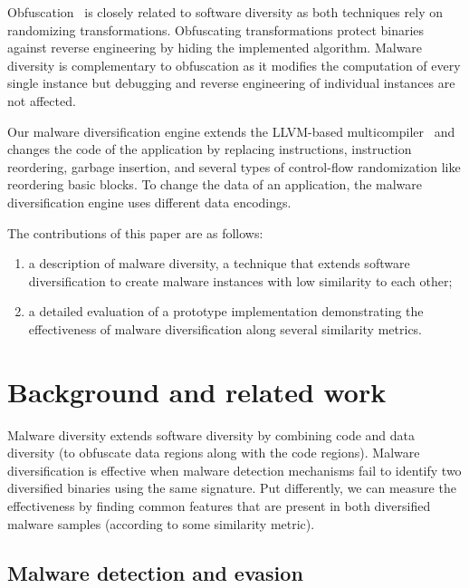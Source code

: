 \documentclass[letterpaper,twocolumn,10pt]{article}
\begin{document}
Obfuscation~\cite{collberg97} is closely related to software diversity as both 
techniques rely on randomizing transformations. Obfuscating transformations
protect binaries against reverse engineering by hiding the implemented algorithm.  
Malware diversity is complementary to obfuscation as it modifies the computation 
of every single instance but debugging and reverse engineering of individual 
instances are not affected.

Our malware diversification engine extends the LLVM-based
multicompiler~\cite{multicompiler, payer14syscan} and changes the code of the
application by replacing instructions, instruction reordering, garbage
insertion, and several types of control-flow randomization like reordering basic
blocks. To change the data of an application, the malware diversification engine
uses different data encodings.


The contributions of this paper are as follows:
\begin{enumerate}
  \item a description of malware diversity, a technique that extends
    software diversification to create malware instances with low similarity to
		each other;
  \item a detailed evaluation of a prototype implementation demonstrating
		the effectiveness of malware diversification along several similarity
    metrics.
\end{enumerate}


\section{Background and related work}

Malware diversity extends software diversity by combining code and
data diversity (to obfuscate data regions along with the code regions).  Malware
diversification is effective when malware detection mechanisms fail to identify
two diversified binaries using the same signature.  Put differently, we can
measure the effectiveness by finding common features that are present in both
diversified malware samples (according to some similarity metric).

\subsection{Malware detection and evasion}
\label{sec:malwarematching}
\end{document}
